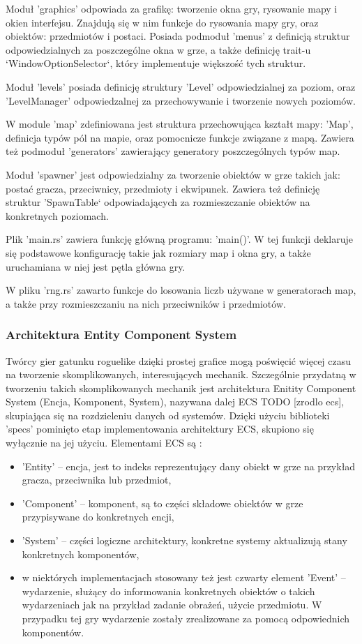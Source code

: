 \documentclass[12pt,twoside]{article}
\begin{document}
Moduł 'graphics' odpowiada za grafikę: tworzenie okna gry, rysowanie mapy i okien interfejsu. Znajdują się w nim funkcje do rysowania mapy gry, oraz obiektów: przedmiotów i postaci. Posiada podmoduł 'menus' z definicją struktur odpowiedzialnych za poszczególne okna w grze, a także definicję trait-u `WindowOptionSelector`, który implementuje większość tych struktur.

Moduł 'levels' posiada definicję struktury 'Level' odpowiedzialnej za poziom, oraz 'LevelManager' odpowiedzalnej za przechowywanie i tworzenie nowych poziomów.

W module 'map' zdefiniowana jest struktura przechowująca kształt mapy: 'Map', definicja typów pól na mapie, oraz pomocnicze funkcje związane z mapą. Zawiera też podmoduł 'generators' zawierający generatory poszczególnych typów map.

Moduł 'spawner' jest odpowiedzialny za tworzenie obiektów w grze takich jak: postać gracza, przeciwnicy, przedmioty i ekwipunek. Zawiera też definicję struktur 'SpawnTable` odpowiadających za rozmieszczanie obiektów na konkretnych poziomach.

Plik 'main.rs' zawiera funkcję główną programu: 'main()'. W tej funkcji deklaruje się podstawowe konfigurację takie jak rozmiary map i okna gry, a także uruchamiana w niej jest pętla główna gry.
 
W pliku 'rng.rs' zawarto funkcje do losowania liczb używane w generatorach map, a także przy rozmieszczaniu na nich przeciwników i przedmiotów.

\subsubsection{Architektura Entity Component System}
Twórcy gier gatunku roguelike dzięki prostej grafice mogą poświęcić więcej czasu na tworzenie skomplikowanych, interesujących mechanik. Szczególnie przydatną w tworzeniu takich skomplikowanych mechanik jest architektura Enitity Component System (Encja, Komponent, System), nazywana dalej ECS TODO [zrodlo ecs], skupiająca się na rozdzieleniu danych od systemów. Dzięki użyciu biblioteki 'specs' pominięto etap implementowania architektury ECS, skupiono się wyłącznie na jej użyciu. Elementami ECS są :

\begin{itemize}
	\item 'Entity' -- encja, jest to indeks reprezentujący dany obiekt w grze na przykład gracza, przeciwnika lub przedmiot,
	\item 'Component' -- komponent, są to części składowe obiektów w grze przypisywane do konkretnych encji,
	\item 'System' -- części logiczne architektury, konkretne systemy aktualizują stany konkretnych komponentów,
	\item w niektórych implementacjach stosowany też jest czwarty element 'Event' -- wydarzenie, służący do informowania konkretnych obiektów o takich wydarzeniach jak na przykład zadanie obrażeń, użycie przedmiotu. W przypadku tej gry wydarzenie zostały zrealizowane za pomocą odpowiednich komponentów.
\end{itemize}
	
\end{document}
